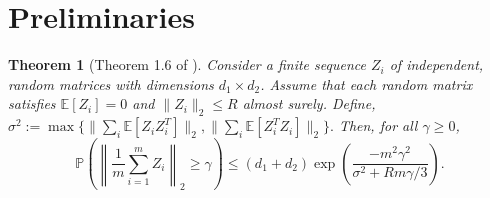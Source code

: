 \documentclass[11pt]{article}
\newtheorem{theorem}[lemma]{Theorem}
\begin{document}
\clearpage
\newpage
\begin{small}


\end{small}
\clearpage
\newpage
\appendix
\section{Preliminaries}\label{app:prelim}
\begin{theorem}[Theorem 1.6 of \cite{Tropp11}]\label{thm:tropp}
Consider a finite sequence $Z_i$ of independent, random matrices with dimensions $d_1\times d_2$. Assume that each random matrix satisfies $\mathbb{E}[Z_i] = 0$ and $\|Z_i\|_2\leq R$ almost surely. Define, $\sigma^2 := \max \{\|\sum_i\mathbb{E}[Z_iZ_i^T]\|_2,\|\sum_i\mathbb{E}[Z_i^TZ_i]\|_2\}.$ Then, for all  $\gamma\geq 0$, $$\mathbb{P}\left(\left\|\frac{1}{m}\sum_{i=1}^mZ_i\right\|_2\geq \gamma\right)\leq (d_1+d_2)\exp\left(\frac{-m^2\gamma^2}{\sigma^2+Rm\gamma/3}\right).$$
\end{theorem}
\end{document}
